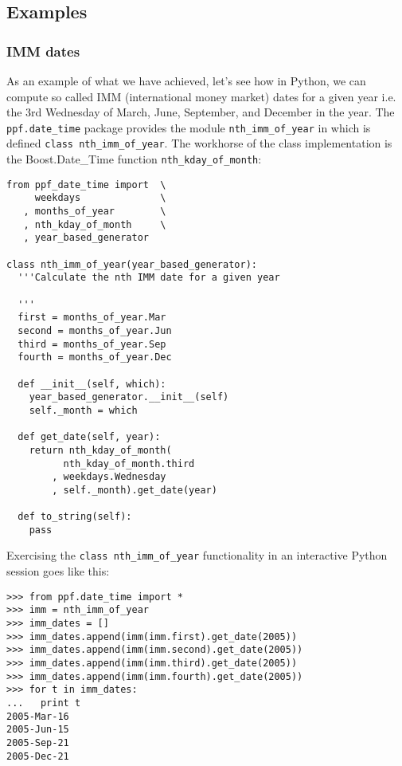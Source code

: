 \subsection{Examples}
\subsubsection{IMM dates}\label{ssec:imm-dates}
As an example of what we have achieved, let's see how in Python, we
can compute so called IMM (international money market) dates for a
given year i.e. the 3rd Wednesday of March, June, September, and
December in the year. The \verb|ppf.date_time| package provides the
module \verb|nth_imm_of_year| in which is defined \verb|class nth_imm_of_year|. 
The workhorse of the class implementation is the
Boost.Date\_Time function \verb|nth_kday_of_month|:
\begin{verbatim}
from ppf_date_time import  \
     weekdays              \
   , months_of_year        \
   , nth_kday_of_month     \
   , year_based_generator

class nth_imm_of_year(year_based_generator):
  '''Calculate the nth IMM date for a given year

  '''
  first = months_of_year.Mar
  second = months_of_year.Jun
  third = months_of_year.Sep
  fourth = months_of_year.Dec

  def __init__(self, which):
    year_based_generator.__init__(self)
    self._month = which

  def get_date(self, year):
    return nth_kday_of_month(
          nth_kday_of_month.third
        , weekdays.Wednesday
        , self._month).get_date(year)

  def to_string(self):
    pass
\end{verbatim}
Exercising the \verb|class nth_imm_of_year| functionality in an
interactive Python session goes like this:
\begin{verbatim}
>>> from ppf.date_time import *
>>> imm = nth_imm_of_year
>>> imm_dates = []
>>> imm_dates.append(imm(imm.first).get_date(2005))
>>> imm_dates.append(imm(imm.second).get_date(2005))
>>> imm_dates.append(imm(imm.third).get_date(2005))
>>> imm_dates.append(imm(imm.fourth).get_date(2005))
>>> for t in imm_dates:
...   print t
2005-Mar-16
2005-Jun-15
2005-Sep-21
2005-Dec-21
\end{verbatim}

